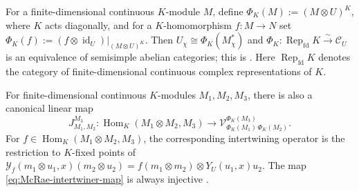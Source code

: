 \documentclass[12pt,leqno]{amsart}
\numberwithin{equation}{section} \newtheorem{thm}{Theorem}[section] \newtheorem{lem}[thm]{Lemma} \newtheorem{ex}[thm]{Example} \newtheorem{prop}[thm]{Proposition} \newtheorem{cor}[thm]{Corollary} \newtheorem{defi}[thm]{Definition} \newtheorem{rmk}[thm]{Remark} \newtheorem{notation}[thm]{Notation}
\newcommand{\id}{\operatorname{id}}
\newcommand{\Rep}{\operatorname{Rep}}
\newcommand{\Hom}{\operatorname{Hom}}
\begin{document}
For a finite-dimensional continuous $K$-module $M$, define \(\Phi_K(M):=(M\otimes U)^K\), where $K$ acts diagonally, and for a $K$-homomorphism $f:M\to N$ set \(\Phi_K(f):=(f\otimes\id_U)\big|_{(M\otimes U)^K}.\) Then \(U_\chi\cong\Phi_K(M_\chi^*)\) and \(\Phi_K:\Rep_{\mathrm{fd}}K\overset{\sim}{\longrightarrow}\mathcal C_U\) is an equivalence of semisimple abelian categories; this is \cite[Proposition~3.5]{McRae}. Here $\Rep_{\mathrm{fd}}K$ denotes the category of finite-dimensional continuous complex representations of $K$.

For finite-dimensional continuous $K$-modules $M_1,M_2,M_3$, there is also a canonical linear map
\begin{equation}\label{eq:McRae-intertwiner-map}
 J^{M_3}_{M_1,M_2}:
 \Hom_K(M_1\otimes M_2,M_3)
 \longrightarrow
 \mathcal V^{\Phi_K(M_3)}_{\Phi_K(M_1)\,\Phi_K(M_2)}.
\end{equation}
For $f\in\Hom_K(M_1\otimes M_2,M_3)$, the corresponding intertwining operator is the restriction to $K$-fixed points of \(\mathcal Y_f(m_1\otimes u_1,x)(m_2\otimes u_2)=f(m_1\otimes m_2)\otimes Y_U(u_1,x)u_2.\) The map \eqref{eq:McRae-intertwiner-map} is always injective \cite[\S3.2]{McRae}.
\end{document}
